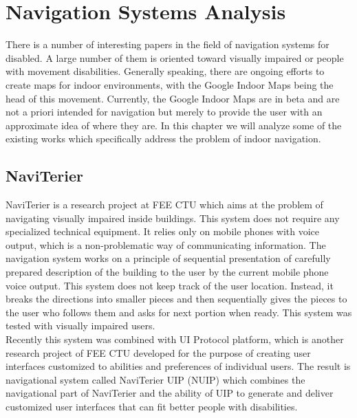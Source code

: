 \section{Navigation Systems Analysis}
There is a number of interesting papers in the field of navigation systems for disabled. A large number of them is oriented toward visually impaired or people with movement disabilities. Generally speaking, there are ongoing efforts to create maps for indoor environments, with the Google Indoor Maps being the head of this movement. Currently, the Google Indoor Maps are in beta and are not a priori intended for navigation but merely to provide the user with an approximate idea of where they are. In this chapter we will analyze some of the existing works which specifically address the problem of indoor navigation.

\subsection{NaviTerier}
NaviTerier \cite{naviterier} is a research project at FEE CTU which aims at the problem of navigating visually impaired inside buildings. This system does not require any specialized technical equipment. It relies only on mobile phones with voice output, which is a non-problematic way of communicating information. The navigation system works on a principle of sequential presentation of carefully prepared description of the building to the user by the current mobile phone voice output. This system does not keep track of the user location. Instead, it breaks the directions into smaller pieces and then sequentially gives the pieces to the user who follows them and asks for next portion when ready. This system was tested with visually impaired users.\\
Recently this system was combined with UI Protocol platform, which is another research project of FEE CTU developed for the purpose of creating user interfaces customized to abilities and preferences of individual users. The result is navigational system called NaviTerier UIP (NUIP) \cite{balata} which combines the navigational part of NaviTerier and the ability of UIP to generate and deliver customized user interfaces that can fit better people with disabilities.

